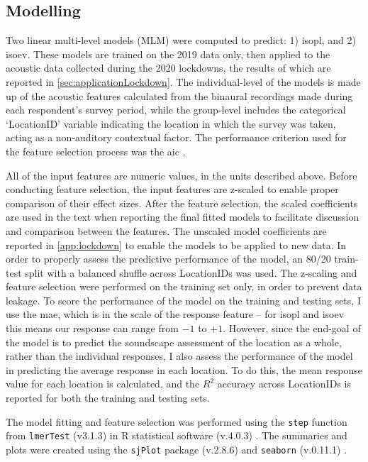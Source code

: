 
 \subsection{Modelling}

   Two linear multi-level models (MLM) were computed to predict: 1) \gls{isopl}, and 2) \gls{isoev}. These models are trained on the 2019 data only, then applied to the acoustic data collected during the 2020 lockdowns, the results of which are reported in \cref{sec:applicationLockdown}. The individual-level of the models is made up of the acoustic features calculated from the binaural recordings made during each respondent's survey period, while the group-level includes the categorical `LocationID' variable indicating the location in which the survey was taken, acting as a non-auditory contextual factor. The performance criterion used for the feature selection process was the \gls{aic} \citep{Akaike1974new}.

   All of the input features are numeric values, in the units described above. Before conducting feature selection, the input features are z-scaled to enable proper comparison of their effect sizes. After the feature selection, the scaled coefficients are used in the text when reporting the final fitted models to facilitate discussion and comparison between the features. The unscaled model coefficients are reported in \cref{app:lockdown} to enable the models to be applied to new data. In order to properly assess the predictive performance of the model, an 80/20 train-test split with a balanced shuffle across LocationIDs was used. The z-scaling and feature selection were performed on the training set only, in order to prevent data leakage. To score the performance of the model on the training and testing sets, I use the \gls{mae}, which is in the scale of the response feature -- for \gls{isopl} and \gls{isoev} this means our response can range from $-1$ to $+1$. However, since the end-goal of the model is to predict the soundscape assessment of the location as a whole, rather than the individual responses, I also assess the performance of the model in predicting the average response in each location. To do this, the mean response value for each location is calculated, and the $R^2$ accuracy across LocationIDs is reported for both the training and testing sets.

   The model fitting and feature selection was performed using the \texttt{step} function from \texttt{lmerTest} (v3.1.3) \citep{Kuznetsova2017lmerTest} in R statistical software (v.4.0.3) \citep{RCT2018R}. The summaries and plots were created using the \texttt{sjPlot} package (v.2.8.6) \citep{Luedecke2021sjPlot} and \texttt{seaborn} (v.0.11.1) \citep{Waskom2021seaborn}.

